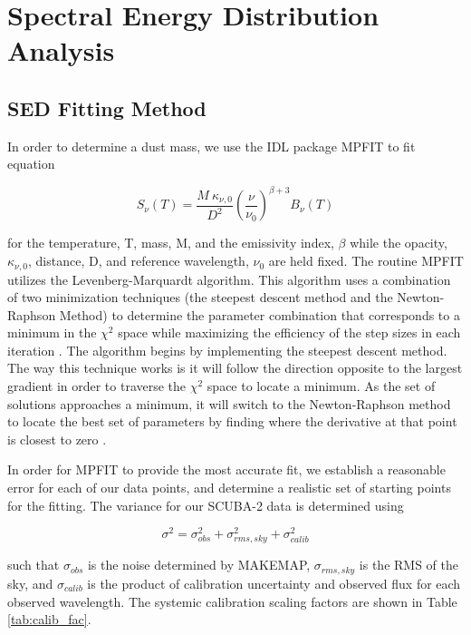 \chapter{Spectral Energy Distribution Analysis}\label{sed}

\section{SED Fitting Method}

In order to determine a dust mass, we use the IDL package MPFIT \citep{markwardt2009} to fit equation 

\begin{equation}\label{eq:mod_sed}
  S_\nu\left(T\right) = \frac{M\:\kappa_{\nu,0}}{D^2}\left(\frac{\nu}{\nu_0}\right)^{\beta+3} B_\nu\left(T\right)
\end{equation}

\noindent for the temperature, T, mass, M, and the emissivity index, $\beta$ while the opacity, $\kappa_{\nu, 0}$, distance, D, and reference wavelength, $\nu_0$ are held fixed.  The routine MPFIT utilizes the Levenberg-Marquardt algorithm.  This algorithm uses a combination of two minimization techniques (the steepest descent method and the Newton-Raphson Method) to determine the parameter combination that corresponds to a minimum in the $\chi^2$ space while maximizing the efficiency of the step sizes in each iteration \citep{burden2001}.  The algorithm begins by implementing the steepest descent method.  The way this technique works is it will follow the direction opposite to the largest gradient in order to traverse the $\chi^2$ space to locate a minimum.  As the set of solutions approaches a minimum, it will switch to the Newton-Raphson method to locate the best set of parameters by finding where the derivative at that point is closest to zero \citep{gavin2013}.  

In order for MPFIT to provide the most accurate fit, we establish a reasonable error for each of our data points, and determine a realistic set of starting points for the fitting.  The variance for our SCUBA-2 data is determined using

\begin{equation}\label{eq:sc2noi}
  \sigma^2 = \sigma_{obs}^2 + \sigma_{rms,sky}^2 + \sigma_{calib}^2
\end{equation}

\noindent such that $\sigma_{obs}$ is the noise determined by MAKEMAP, $\sigma_{rms,sky}$ is the RMS of the sky, and $\sigma_{calib}$ is the product of calibration uncertainty and observed flux for each observed wavelength.  The systemic calibration scaling factors are shown in Table \ref{tab:calib_fac}.

